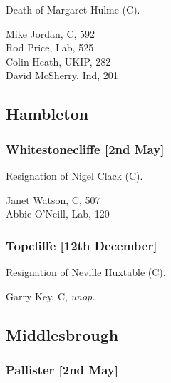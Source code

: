 \documentclass[a4paper,openany,10pt]{book}
\begin{document}

Death of Margaret Hulme (C).



Mike Jordan, C, 592\\
Rod Price, Lab, 525\\
Colin Heath, UKIP, 282\\
David McSherry, Ind, 201\\


\subsection*{Hambleton}

\subsubsection*{Whitestonecliffe \hspace*{\fill}\nolinebreak[1]%
\enspace\hspace*{\fill}
[2nd May]}


Resignation of Nigel Clack (C).



Janet Watson, C, 507\\
Abbie O'Neill, Lab, 120\\


\subsubsection*{Topcliffe \hspace*{\fill}\nolinebreak[1]%
\enspace\hspace*{\fill}
[12th December]}


Resignation of Neville Huxtable (C).



Garry Key, C, \emph{unop.}\\


\subsection*{Middlesbrough}

\subsubsection*{Pallister \hspace*{\fill}\nolinebreak[1]%
\enspace\hspace*{\fill}
[2nd May]}
\end{document}
